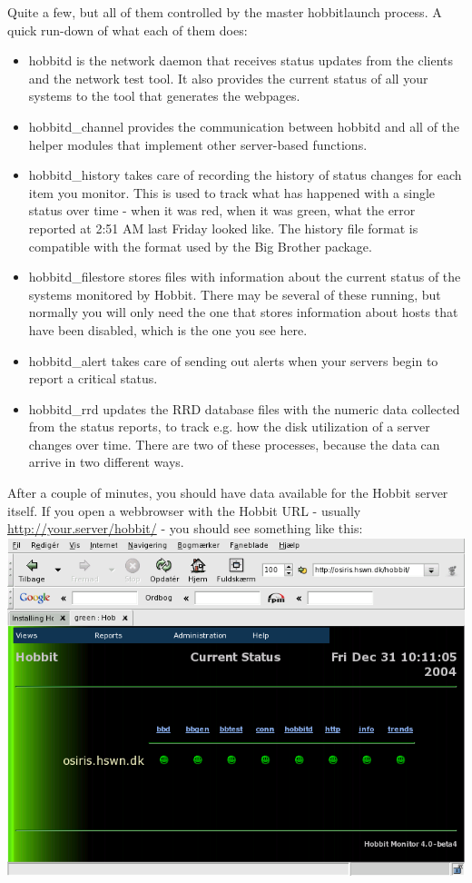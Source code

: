  Quite a few, but all of them controlled by the master hobbitlaunch process. A quick run-down of what each of them does:
\begin{itemize}
\item hobbitd is the network daemon that receives status updates from the clients and the network test tool. It also provides the current status of all your systems to the tool that generates the webpages.
\item hobbitd\_channel provides the communication between hobbitd and all of the helper modules that implement other server-based functions.
\item hobbitd\_history takes care of recording the history of status changes for each item you monitor. This is used to track what has happened with a single status over time - when it was red, when it was green, what the error reported at 2:51 AM last Friday looked like. The history file format is compatible with the format used by the Big Brother package.
\item hobbitd\_filestore stores files with information about the current status of the systems monitored by Hobbit. There may be several of these running, but normally you will only need the one that stores information about hosts that have been disabled, which is the one you see here.
\item hobbitd\_alert takes care of sending out alerts when your servers begin to report a critical status.
\item hobbitd\_rrd updates the RRD database files with the numeric data collected from the status reports, to track e.g. how the disk utilization of a server changes over time. There are two of these processes, because the data can arrive in two different ways.

\end{itemize}


 After a couple of minutes, you should have data available for the Hobbit server itself. If you open a webbrowser with the Hobbit URL - usually \url{http://your.server/hobbit/} - you should see something like this:\\ 
\includegraphics[scale=1]{./hobbitmain.png} 


